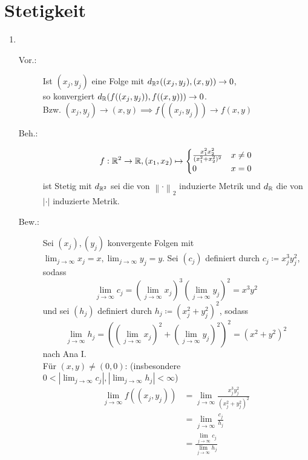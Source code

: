 \documentclass[sectionformat=aufgabe]{gadsescript}
\begin{document}
\maketitle
\section{Stetigkeit}
\begin{enumerate}[label=(\alph*)]
	\item ~
		\begin{description}
			\item[Vor.:] Ist $ (x_j, y_j) $ eine Folge mit $ d_{\mathbb{R} ^2} ((x_j, y_j), (x, y)) \to 0 $,\\
				so konvergiert $ d_{\mathbb{R} } (f((x_j, y_j)), f((x, y))) \to 0$.\\
				Bzw. $ (x_j, y_j) \to (x, y) \implies f((x_j, y_j)) \to f(x, y) $
			\item[Beh.:]
				\[
					f:\mathbb{R} ^2 \to \mathbb{R} , (x_1, x_2) \mapsto 
					\begin{cases}
						\frac{ x_1^2x_2^2 }{ (x_1^2 + x_2^2)^2 } & x \neq 0\\
						0 & x = 0
					\end{cases}
				\]
				ist Stetig mit $ d_{\mathbb{R} ^2}  $ sei die von $ \left\| \cdot  \right\| _2 $ induzierte Metrik und $ d_{\mathbb{R} }  $ die von $ \left| \cdot  \right|  $ induzierte Metrik.
			\item[Bew.:]
				Sei $ (x_j), (y_j) $ konvergente Folgen mit $ \lim_{j \to \infty} x_j = x, \lim_{j \to \infty} y_j = y $. Sei $ (c_j) $ definiert durch $ c_j \coloneqq x_j^3y_j^2 $, sodass
				\[
					\lim_{j \to \infty} c_j = \left( \lim_{j \to \infty} x_j \right)^3 \left( \lim_{j \to \infty} y_j \right) ^2 = x^3 y^2
				\]
				und sei $ (h_j) $ definiert durch $ h_j \coloneqq (x_j^2 + y_j^2)^2 $, sodass
				\[
					\lim_{j \to \infty} h_j = \left( \left( \lim_{j \to \infty} x_j \right) ^2 + \left( \lim_{j \to \infty} y_j \right) ^2 \right) ^2 = (x^2 + y^2)^2
				\]
				nach Ana I.\\
				Für $ (x, y) \neq (0, 0) $: (insbesondere $ 0 < \left| \lim_{j \to \infty} c_j \right| , \left| \lim_{j \to \infty} h_j \right| < \infty $)
				\begin{align*}
					\lim_{j \to \infty} f((x_j, y_j)) &= \lim_{j \to \infty} \frac{x_j^3 y_j^2}{ (x_j^2 + y_j^2)^2 } \\
					~ &= \lim_{j \to \infty} \frac{c_j}{ h_j } \\
					~ &= \frac{ \lim_{j \to \infty} c_j }{ \lim_{j \to \infty} h_j }  \\

\end{align*}
\end{description}
\end{enumerate}
\end{document}

